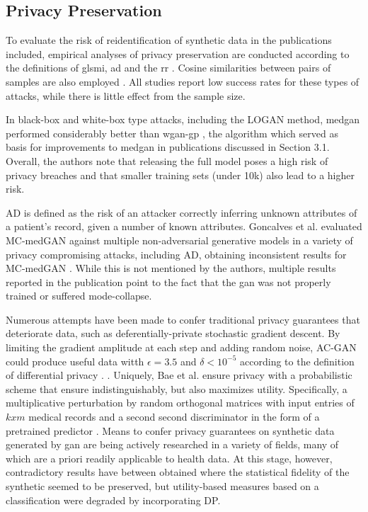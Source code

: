 \subsection{Privacy Preservation}
To evaluate the risk of reidentification of synthetic data in the publications included, empirical analyses of privacy preservation are conducted according to the definitions of gls{mi}, \gls{ad}  \cite{Choi2017-nt,Goncalves2020,yan2020generating} and the \gls{rr} \cite{Zhang2020}. Cosine similarities between pairs of samples are also employed \cite{torfi2019generating}. All studies report low success rates for these types of attacks, while there is little effect from the sample size. \par
In black-box and white-box type attacks, including the LOGAN \cite{hayes2017logan} method, \gls{medgan} performed considerably better than \gls{wgan-gp} \cite{gulrajani2017improved}, the algorithm which served as basis for improvements to \gls{medgan} in publications discussed in Section 3.1. Overall, the authors note that releasing the full model poses a high risk of privacy breaches and that smaller training sets (under 10k) also lead to a higher risk.\par  
AD is defined as the risk of an attacker correctly inferring unknown attributes of a patient's record, given a number of known attributes. Goncalves et al. evaluated MC-medGAN against multiple non-adversarial generative models in a variety of privacy compromising attacks, including AD, obtaining inconsistent results for MC-medGAN \cite{Goncalves2020}. While this is not mentioned by the authors, multiple results reported in the publication point to the fact that the \gls{gan} was not properly trained or suffered mode-collapse.\par
Numerous attempts have been made to confer traditional privacy guarantees that deteriorate data, such as deferentially-private stochastic gradient descent. By limiting the gradient amplitude at each step and adding random noise, AC-GAN could produce useful data witth $\epsilon=3.5$ and $\delta<10^{-5}$ according to the definition of differential privacy \cite{Beaulieu-Jones2019-ct, esteban2017real,chincheong2020generation}. \cite{BaeAnomiGAN2020}. Uniquely, Bae et al. ensure privacy with a probabilistic scheme that ensure indistinguishably, but also maximizes utility. Specifically, a multiplicative perturbation by random orthogonal matrices with input entries of $k x m$ medical records and a second second discriminator in the form of a pretrained  predictor \cite{BaeAnomiGAN2020}. Means to confer privacy guarantees on synthetic data generated by \gls{gan} are being actively researched in a variety of fields, many of which are a priori readily applicable to health data. At this stage, however, contradictory results have between obtained where the statistical fidelity of the synthetic seemed to be preserved, but utility-based measures based on a classification were degraded by incorporating DP.\par
